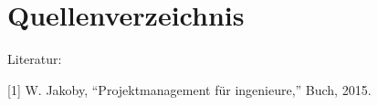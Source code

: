 \section{Quellenverzeichnis} \label{sec:anhang}
Literatur: 
\newline

[1] W. Jakoby, “Projektmanagement für ingenieure,” Buch, 2015.
